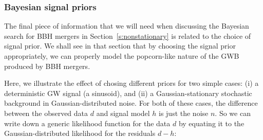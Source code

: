 \subsubsection{Bayesian signal priors}
\label{s:signal_priors}

The final piece of information that we will need when 
discussing the Bayesian search for BBH mergers in 
Section~\ref{s:nonstationary} is related to the choice 
of signal prior.
We shall see in that section that by choosing the 
signal prior appropriately, we can properly model 
the popcorn-like nature of the GWB produced by BBH 
mergers.

Here, we illustrate the effect of chosing different
priors for two simple cases: 
(i) a deterministic GW signal (a sinusoid), and 
(ii) a Gaussian-stationary stochastic background in 
Gaussian-distributed noise.
For both of these cases, the difference between the 
observed data $d$ and signal model $h$ is just 
the noise $n$.
So we can write down a generic likelihood function for 
the data $d$ by equating it to the 
Gaussian-distributed likelihood for the residuals $d-h$:
%
